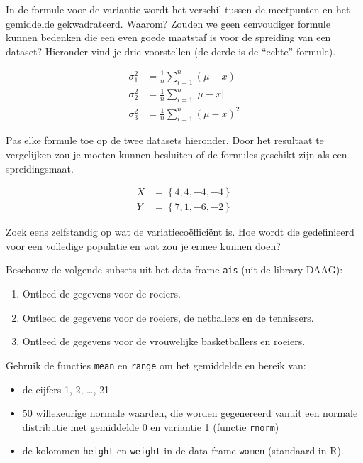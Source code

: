 \begin{exercise}
  \label{ex:variance-formula}
  In de formule voor de variantie wordt het verschil tussen de meetpunten en het gemiddelde gekwadrateerd. Waarom? Zouden we geen eenvoudiger formule kunnen bedenken die een even goede maatstaf is voor de spreiding van een dataset? Hieronder vind je drie voorstellen (de derde is de ``echte'' formule).

  \begin{align}
    \sigma^{2}_{1} &= \frac{1}{n} \sum_{i=1}^{n} (\mu - x) \\
    \sigma^{2}_{2} &= \frac{1}{n} \sum_{i=1}^{n} \left| \mu - x\right| \\
    \sigma^{2}_{3} &= \frac{1}{n} \sum_{i=1}^{n} (\mu - x)^{2}
  \end{align}

  Pas elke formule toe op de twee datasets hieronder. Door het resultaat te vergelijken zou je moeten kunnen besluiten of de formules geschikt zijn als een spreidingsmaat.
  
  \begin{align*}
    X &= \left\{ 4,4,-4,-4 \right\} \\
    Y &= \left\{ 7,1,-6,-2 \right\}
  \end{align*}

\end{exercise}

\begin{exercise}
Zoek eens zelfstandig op wat de variatieco\"effici\"ent is. Hoe
wordt die gedefinieerd voor een volledige populatie en wat zou
je ermee kunnen doen?
\end{exercise}

\begin{exercise}
  \label{ex:ais}
Beschouw de volgende subsets uit het data frame \texttt{ais} (uit de library DAAG):
\begin{enumerate}
\item Ontleed de gegevens voor de roeiers.
\item Ontleed de gegevens voor de roeiers, de netballers en de tennissers.
\item Ontleed de gegevens voor de vrouwelijke basketballers en roeiers.
\end{enumerate}
\end{exercise}

\begin{exercise}
Gebruik de functies \texttt{mean} en \texttt{range} om het gemiddelde en bereik van:
\begin{itemize}
  \item de cijfers 1, 2, \dots, 21 
  \item 50 willekeurige normale waarden, die  worden gegenereerd vanuit een normale distributie met gemiddelde 0 en variantie 1 (functie \texttt{rnorm})
  \item de kolommen \texttt{height} en \texttt{weight} in de data frame \texttt{women} (standaard in R).
\end{itemize}
\end{exercise}

